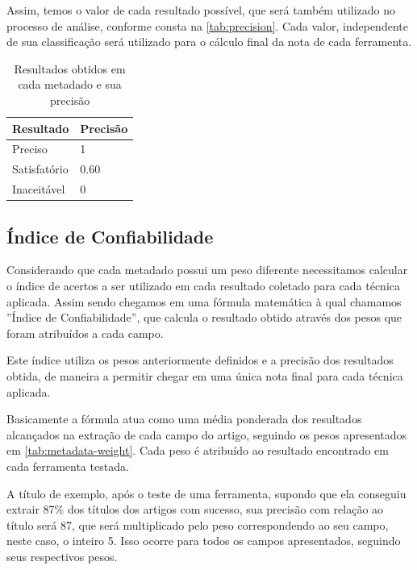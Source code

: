 Assim, temos o valor de cada resultado possível, que será também utilizado no processo de análise, conforme consta na \autoref{tab:precision}. Cada valor, independente de sua classificação será utilizado para o cálculo final da nota de cada ferramenta.


\begin{table}
    \caption{Resultados obtidos em cada metadado e sua precisão}
    \begin{center}
        \begin{tabular}{|C{3cm}|C{3cm}|}
            \hline \textbf{Resultado} & \textbf{Precisão} \\ 
            \hline Preciso & 1\\
            \hline Satisfatório & 0.60 \\
            \hline Inaceitável & 0 \\
            \hline 
        \end{tabular} 
    \end{center}
    \label{tab:precision}
\end{table}

\subsection{Índice de Confiabilidade}
\label{ssec:confiability-index}


Considerando que cada metadado possui um peso diferente necessitamos calcular o índice de acertos a ser utilizado em cada resultado coletado para cada técnica aplicada. Assim sendo chegamos em uma fórmula matemática à qual chamamos ''Índice de Confiabilidade'', que calcula o resultado obtido através dos pesos que foram atribuídos a cada campo.

Este índice utiliza os pesos anteriormente definidos e a precisão dos resultados obtida, de maneira a permitir chegar em uma única nota final para cada técnica aplicada.

Basicamente a fórmula atua como uma média ponderada dos resultados alcançados na extração de cada campo do artigo, seguindo os pesos apresentados em \autoref{tab:metadata-weight}. Cada peso é atribuído ao resultado encontrado em cada ferramenta testada. 

A título de exemplo, após o teste de uma ferramenta, supondo que ela conseguiu extrair 87\% dos títulos dos artigos com sucesso, sua precisão com relação ao título será 87, que será multiplicado pelo peso correspondendo ao seu campo, neste caso, o inteiro 5. Isso ocorre para todos os campos apresentados, seguindo seus respectivos pesos.


